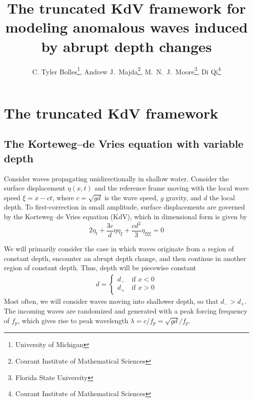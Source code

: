 \documentclass[11pt]{article}
\newcommand{\freqp}{f_p}
\newcommand{\depth}{d}
\newcommand{\dup}{\depth_{-}}
\newcommand{\ddn}{\depth_{+}}
\newcommand{\lam}{\lambda}
\begin{document}
\title{The truncated KdV framework for modeling anomalous waves induced by abrupt depth changes}

\author{
C. Tyler Bolles\thanks{University of Michigan},
Andrew J.~Majda\thanks{Courant Institute of Mathematical Sciences}, 
M.~N.~J.~Moore\thanks{Florida State University}, 
Di Qi\thanks{Courant Institute of Mathematical Sciences} }
\maketitle



\section{The truncated KdV framework}


\subsection{The Korteweg–de Vries equation with variable depth}
Consider waves propagating unidirectionally in shallow water. Consider the surface displacement $\eta(x,t)$ and the reference frame moving with the local wave speed $\xi = x - ct$, where $c = \sqrt{g \depth}$ is the wave speed, $g$ gravity, and $\depth$ the local depth.
To first-correction in small amplitude, surface displacements are governed by the Korteweg–de Vries equation (KdV), which in dimensional form is given by
\begin{equation}
2 \eta_t + \frac{3 c}{\depth} \eta \eta_{\xi} + \frac{c \depth^2}{3} \eta_{\xi \xi \xi} = 0
\end{equation}

We will primarily consider the case in which waves originate from a region of constant depth, encounter an abrupt depth change, and then continue in another region of constant depth. Thus, depth will be piecewise constant
\begin{align}
\depth = 
\begin{cases}
\dup \quad \mbox{if } x<0 \\
\ddn \quad \mbox{if } x>0
\end{cases}
\end{align}
Most often, we will consider waves moving into shallower depth, so that $\dup > \ddn$. The incoming waves are randomized and generated with a peak forcing frequency of $\freqp$, which gives rise to peak wavelength $\lam = c/\freqp = \sqrt{g \depth} / \freqp$.
\end{document}

